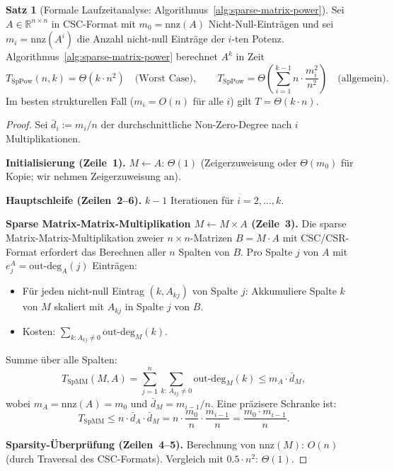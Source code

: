 \documentclass[a4paper,12pt]{report}
\theoremstyle{definition}
\newtheorem{satz}{Satz}
\begin{document}
	\begin{satz}[Formale Laufzeitanalyse: Algorithmus~\ref{alg:sparse-matrix-power}]
		\label{satz:laufzeit-sparse-power}
		Sei $A \in \mathbb{R}^{n \times n}$ in CSC-Format mit $m_0 = \mathrm{nnz}(A)$ Nicht-Null-Einträgen und sei $m_i = \mathrm{nnz}(A^i)$ die Anzahl nicht-null Einträge der $i$-ten Potenz. Algorithmus~\ref{alg:sparse-matrix-power} berechnet $A^k$ in Zeit
		\[
			T_{\mathrm{SpPow}}(n, k) = \Theta\!\left(k \cdot n^2\right) \quad \text{(Worst Case)},
			\qquad
			T_{\mathrm{SpPow}} = \Theta\!\left(\sum_{i=1}^{k-1} n \cdot \frac{m_i^2}{n^2}\right) \quad \text{(allgemein)}.
		\]
		Im besten strukturellen Fall ($m_i = O(n)$ für alle $i$) gilt $T = \Theta(k \cdot n)$.
	\end{satz}
	\begin{proof}
		Sei $\bar{d}_i := m_i / n$ der durchschnittliche Non-Zero-Degree nach $i$ Multiplikationen.

		\textbf{Initialisierung (Zeile~1).} $M \gets A$: $\Theta(1)$ (Zeigerzuweisung oder $\Theta(m_0)$ für Kopie; wir nehmen Zeigerzuweisung an).

		\textbf{Hauptschleife (Zeilen~2--6).} $k-1$ Iterationen für $i = 2, \ldots, k$.

		\textbf{Sparse Matrix-Matrix-Multiplikation $M \gets M \times A$ (Zeile~3).}
		Die sparse Matrix-Matrix-Multiplikation zweier $n{\times}n$-Matrizen $B = M \cdot A$ mit CSC/CSR-Format erfordert das Berechnen aller $n$ Spalten von $B$. Pro Spalte $j$ von $A$ mit $e_j^A = \mathrm{out\text{-}deg}_A(j)$ Einträgen:
		\begin{itemize}
			\item Für jeden nicht-null Eintrag $(k, A_{kj})$ von Spalte $j$: Akkumuliere Spalte $k$ von $M$ skaliert mit $A_{kj}$ in Spalte $j$ von $B$.
			\item Kosten: $\sum_{k: A_{kj} \neq 0} \mathrm{out\text{-}deg}_M(k)$.
		\end{itemize}
		Summe über alle Spalten:
		\[
			T_{\mathrm{SpMM}}(M, A) = \sum_{j=1}^n \sum_{k:\, A_{kj} \neq 0} \mathrm{out\text{-}deg}_M(k) \leq m_A \cdot \bar{d}_M,
		\]
		wobei $m_A = \mathrm{nnz}(A) = m_0$ und $\bar{d}_M = m_{i-1}/n$. Eine präzisere Schranke ist:
		\[
			T_{\mathrm{SpMM}} \leq n \cdot \bar{d}_A \cdot \bar{d}_M = n \cdot \frac{m_0}{n} \cdot \frac{m_{i-1}}{n} = \frac{m_0 \cdot m_{i-1}}{n}.
		\]

		\textbf{Sparsity-Überprüfung (Zeilen~4--5).} Berechnung von $\mathrm{nnz}(M)$: $O(n)$ (durch Traversal des CSC-Formats). Vergleich mit $0.5 \cdot n^2$: $\Theta(1)$.


\end{proof}
\end{document}
